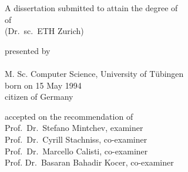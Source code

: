 \begin{titlepage}
    \begin{center}
        \large
        \begingroup
        \endgroup

        \hfill

        \vfill

        \begingroup
            \spacedallcaps{\myTitle}
        \endgroup

        \vfill

        \begingroup
            A dissertation submitted to attain the degree of\\
            \vspace{0.5em}
            of
             \\
            (Dr.\ sc.\ ETH Zurich)
        \endgroup

        \vfill

        \begingroup
            presented by\\
            \vspace{0.5em}
            \spacedlowsmallcaps{\myName}\\
            M. Sc. Computer Science, University of Tübingen \\
            \vspace{0.5em}
            born on 15 May 1994\\
            citizen of Germany
        \endgroup

        \vfill

        \begingroup
            accepted on the recommendation of\\
            \vspace{0.5em}
            Prof.\ Dr.\ Stefano Mintchev, examiner\\
            Prof.\ Dr.\ Cyrill Stachniss, co-examiner\\
            Prof.\ Dr.\ Marcello Calisti, co-examiner\\
            Prof. Dr.\ Basaran Bahadir Kocer, co-examiner
        \endgroup

        \vfill

        \myTime%

        \vfill
    \end{center}
\end{titlepage}
